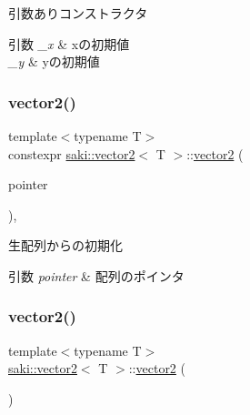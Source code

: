 引数ありコンストラクタ 


\begin{DoxyParams}{引数}
{\em \+\_\+x} & xの初期値 \\
\hline
{\em \+\_\+y} & yの初期値 \\
\hline
\end{DoxyParams}
\mbox{\label{classsaki_1_1vector2_a1617f6938d6e36c7c5d6921719b19b14}} 
\subsubsection{\texorpdfstring{vector2()}{vector2()}\hspace{0.1cm}{\footnotesize\ttfamily [3/5]}}
{\footnotesize\ttfamily template$<$typename T$>$ \\
constexpr \mbox{\hyperlink{classsaki_1_1vector2}{saki\+::vector2}}$<$ T $>$\+::\mbox{\hyperlink{classsaki_1_1vector2}{vector2}} (\begin{DoxyParamCaption}\item[{const\+\_\+pointer const}]{pointer }\end{DoxyParamCaption})\hspace{0.3cm}{\ttfamily [inline]}, {\ttfamily [explicit]}}



生配列からの初期化 


\begin{DoxyParams}{引数}
{\em pointer} & 配列のポインタ \\
\hline
\end{DoxyParams}
\mbox{\label{classsaki_1_1vector2_a10bf1b89f32e86f02e065d099d2a393c}} 
\subsubsection{\texorpdfstring{vector2()}{vector2()}\hspace{0.1cm}{\footnotesize\ttfamily [4/5]}}
{\footnotesize\ttfamily template$<$typename T$>$ \\
\mbox{\hyperlink{classsaki_1_1vector2}{saki\+::vector2}}$<$ T $>$\+::\mbox{\hyperlink{classsaki_1_1vector2}{vector2}} (\begin{DoxyParamCaption}\item[{const \mbox{\hyperlink{classsaki_1_1vector2}{vector2}}$<$ value\+\_\+type $>$ \&}]{ }\end{DoxyParamCaption})\hspace{0.3cm}{\ttfamily [default]}}

